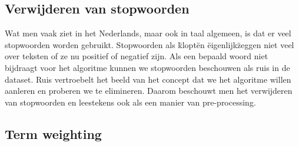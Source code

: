 \subsection{Verwijderen van stopwoorden}\label{Verwijderen van stopwoorden en leestekens}

Wat men vaak ziet in het Nederlands, maar ook in taal algemeen, is dat er veel stopwoorden worden gebruikt. Stopwoorden als \"klopt\" en \"eigenlijk\" zeggen niet veel over teksten of ze nu positief of negatief zijn. Als een bepaald woord niet bijdraagt voor het algoritme kunnen we stopwoorden beschouwen als ruis in de dataset. Ruis vertroebelt het beeld van het concept dat we het algoritme willen aanleren en proberen we te elimineren. Daarom beschouwt men het verwijderen van stopwoorden en leestekens ook als een manier van pre-processing.

\subsection{Term weighting}\label{Term weighting}

